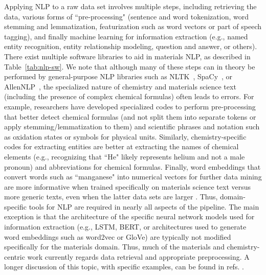 \documentclass[pdflatex,sn-mathphys]{sn-jnl}%
\theoremstyle{thmstyleone}%
\theoremstyle{thmstyletwo}%
\theoremstyle{thmstylethree}%
\begin{document}
Applying NLP to a raw data set involves multiple steps, including retrieving the data, various forms of ``pre-processing" (sentence and word tokenization, word stemming and lemmatization, featurization such as word vectors or part of speech tagging), and finally machine learning for information extraction (e.g., named entity recognition, entity relationship modeling, question and answer, or others). There exist multiple software libraries to aid in materials NLP, as described in Table~\ref{tab:nlp-sw}.
We note that although many of these steps can in theory be performed by general-purpose NLP libraries such as NLTK~\cite{xue_2010}, SpaCy~\cite{spacy2}, or AllenNLP~\cite{Gardner2017AllenNLP}, the specialized nature of chemistry and materials science text (including the presence of complex chemical formulas) often leads to errors. For example, researchers have developed specialized codes to perform pre-processing that better detect chemical formulas (and not split them into separate tokens or apply stemming/lemmatization to them) and scientific phrases and notation such as oxidation states or symbols for physical units. Similarly, chemistry-specific codes for extracting entities are better at extracting the names of chemical elements (e.g., recognizing that ``He" likely represents helium and not a male pronoun) and abbreviations for chemical formulas. Finally, word embeddings that convert words such as ``manganese" into numerical vectors for further data mining are more informative when trained specifically on materials science text versus more generic texts, even when the latter data sets are larger \cite{tshitoyan2019unsupervised}. Thus, domain-specific tools for NLP are required in nearly all aspects of the pipeline. The main exception is that the architecture of the specific neural network models used for information extraction (e.g., LSTM, BERT, or architectures used to generate word embeddings such as word2vec or GloVe) are typically not modified specifically for the materials domain. Thus, much of the materials and chemistry-centric work currently regards data retrieval and appropriate preprocessing. A longer discussion of this topic, with specific examples, can be found in refs. \cite{kononova2021opportunities,olivetti2020data}.
\end{document}
